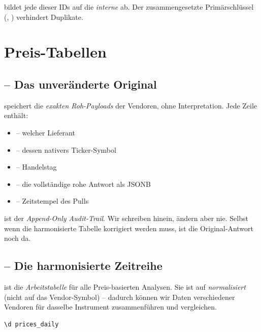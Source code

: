  bildet jede dieser IDs auf die
\emph{interne}  ab. Der zusammengesetzte
Primärschlüssel (, ) verhindert Duplikate.

\section{Preis-Tabellen}

\subsection{ -- Das unveränderte Original}

 speichert die \emph{exakten Roh-Payloads} der
Vendoren, ohne Interpretation. Jede Zeile enthält:

\begin{itemize}
  \item {} -- welcher Lieferant
  \item {} -- dessen nativers Ticker-Symbol
  \item {} -- Handelstag
  \item {} -- die vollständige rohe Antwort als JSONB
  \item {} -- Zeitstempel des Pulls
\end{itemize}

\begin{merke}
 ist der \emph{Append-Only Audit-Trail}. Wir
schreiben hinein, ändern aber nie. Selbst wenn die harmonisierte
Tabelle  korrigiert werden muss, ist die
Original-Antwort noch da.
\end{merke}

\subsection{ -- Die harmonisierte Zeitreihe}

 ist die \emph{Arbeitstabelle} für alle
Preis-basierten Analysen. Sie ist auf 
\emph{normalisiert} (nicht auf das Vendor-Symbol) -- dadurch
können wir Daten verschiedener Vendoren für dasselbe Instrument
zusammenführen und vergleichen.

\begin{lstlisting}[language=sql, caption={Auszug aus \code{prices\_daily}}]
\d prices_daily
\end{lstlisting}

